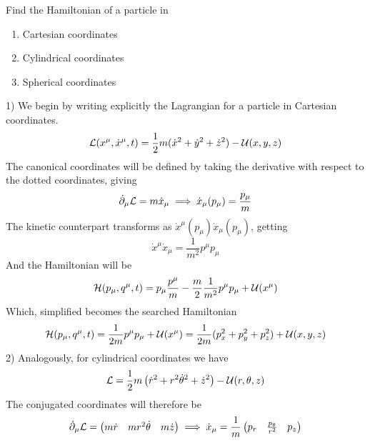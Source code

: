 \documentclass[../admech.tex]{subfiles}
\begin{document}
\begin{exe}[Hamiltonians]
	Find the Hamiltonian of a particle in
	\begin{enumerate}
	\item Cartesian coordinates
	\item Cylindrical coordinates
	\item Spherical coordinates
	\end{enumerate}
1) We begin by writing explicitly the Lagrangian for a particle in Cartesian coordinates.
\begin{equation}
	\mathcal{L}(x^\mu,\dot{x}^\mu,t)=\frac{1}{2}m(\dot{x}^2+\dot{y}^2+\dot{z}^2)-\mathcal{U}(x,y,z)
	\label{eq:xyzlag}
\end{equation}
The canonical coordinates will be defined by taking the derivative with respect to the dotted coordinates, giving
\begin{equation}
	\dot{\partial}_\mu\mathcal{L}=m\dot{x}_\mu\implies\dot{x}_\mu(p_\mu)=\frac{p_\mu}{m}
	\label{eq:cancoordxyzham}
\end{equation}
The kinetic counterpart transforms as $\dot{x}^\mu(p_\mu)\dot{x}_\mu(p_\mu)$, getting
\begin{equation*}
	\dot{x}^\mu\dot{x}_\mu=\frac{1}{m^2}p^\mu p_\mu
\end{equation*}
And the Hamiltonian will be
\begin{equation}
	\mathcal{H}(p_\mu,q^\mu,t)=p_\mu\frac{p^\mu}{m}-\frac{m}{2}\frac{1}{m^2}p^\mu p_\mu+\mathcal{U}(x^\mu)
	\label{eq:hamxyz1}
\end{equation}
Which, simplified becomes the searched Hamiltonian
\begin{equation}
	\mathcal{H}(p_\mu,q^\mu,t)=\frac{1}{2m}p^\mu p_\mu+\mathcal{U}(x^\mu)=\frac{1}{2m}(p_x^2+p_y^2+p_z^2)+\mathcal{U}(x,y,z)
	\label{eq:xyzham}
\end{equation}
2) Analogously, for cylindrical coordinates we have
\begin{equation}
	\mathcal{L}=\frac{1}{2}m\left( \dot{r}^2+r^2\dot{\theta}^2+\dot{z}^2 \right)-\mathcal{U}(r,\theta,z)
	\label{eq:cyllag}
\end{equation}
The conjugated coordinates will therefore be
\begin{equation}
	\dot{\partial}_\mu\mathcal{L}=\begin{pmatrix}
		m\dot{r}&mr^2\dot{\theta}&m\dot{z}
	\end{pmatrix}\implies\dot{x}_\mu=\frac{1}{m}\begin{pmatrix}
		p_r&\frac{p_\theta}{r^2}&p_z
	\end{pmatrix}
	\label{eq:conjmom}
\end{equation}

\end{exe}
\end{document}
